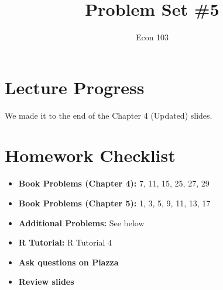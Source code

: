 \documentclass[addpoints,12pt]{exam}
\title{Problem Set \#5}
\author{Econ 103}
\date{}
\begin{document}
\maketitle

\section*{Lecture Progress}
We made it to the end of the Chapter 4 (Updated) slides.

\section*{Homework Checklist}

\begin{itemize}[label = $\square$]
	\item \textbf{Book Problems (Chapter 4):} 7, 11, 15, 25, 27, 29
	\item \textbf{Book Problems (Chapter 5):} 1, 3, 5, 9, 11, 13, 17
	\item \textbf{Additional Problems: }See below
	\item\textbf{R Tutorial:} R Tutorial 4
	\item \textbf{Ask questions on Piazza}
	\item\textbf{Review slides}
\end{itemize}
\end{document}
